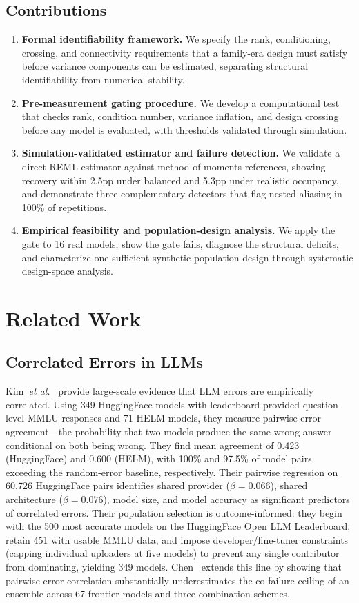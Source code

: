 \documentclass{ieeeaccess}
\theoremstyle{definition}
\theoremstyle{plain}
\begin{document}
\subsection{Contributions}
\begin{enumerate}
\item \textbf{Formal identifiability framework.} We specify the rank, conditioning, crossing, and connectivity requirements that a family-era design must satisfy before variance components can be estimated, separating structural identifiability from numerical stability.
\item \textbf{Pre-measurement gating procedure.} We develop a computational test that checks rank, condition number, variance inflation, and design crossing before any model is evaluated, with thresholds validated through simulation.
\item \textbf{Simulation-validated estimator and failure detection.} We validate a direct REML estimator against method-of-moments references, showing recovery within 2.5pp under balanced and 5.3pp under realistic occupancy, and demonstrate three complementary detectors that flag nested aliasing in 100\% of repetitions.
\item \textbf{Empirical feasibility and population-design analysis.} We apply the gate to 16 real models, show the gate fails, diagnose the structural deficits, and characterize one sufficient synthetic population design through systematic design-space analysis.
\end{enumerate}

\section{Related Work}
\label{sec:related}

\subsection{Correlated Errors in LLMs}
Kim~\textit{et al.}~\cite{kim2025} provide large-scale evidence that LLM errors are empirically correlated. Using 349 HuggingFace models with leaderboard-provided question-level MMLU responses and 71 HELM models, they measure pairwise error agreement---the probability that two models produce the same wrong answer conditional on both being wrong. They find mean agreement of 0.423 (HuggingFace) and 0.600 (HELM), with 100\% and 97.5\% of model pairs exceeding the random-error baseline, respectively. Their pairwise regression on 60,726 HuggingFace pairs identifies shared provider ($\beta = 0.066$), shared architecture ($\beta = 0.076$), model size, and model accuracy as significant predictors of correlated errors. Their population selection is outcome-informed: they begin with the 500 most accurate models on the HuggingFace Open LLM Leaderboard, retain 451 with usable MMLU data, and impose developer/fine-tuner constraints (capping individual uploaders at five models) to prevent any single contributor from dominating, yielding 349 models. Chen~\cite{chen2026} extends this line by showing that pairwise error correlation substantially underestimates the co-failure ceiling of an ensemble across 67 frontier models and three combination schemes.
\end{document}
